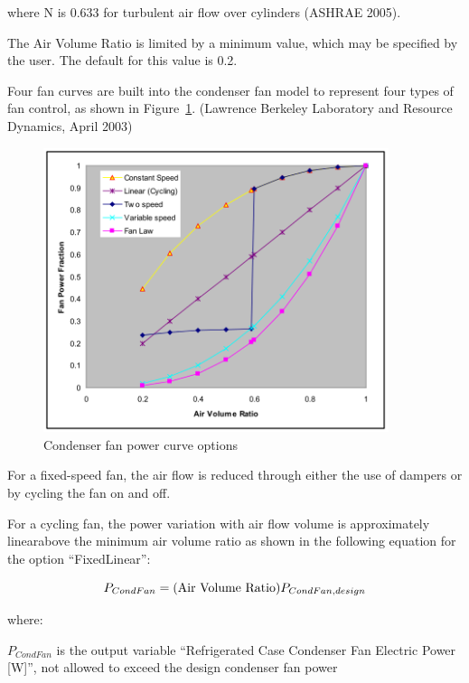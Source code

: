 where N is 0.633 for turbulent air flow over cylinders (ASHRAE 2005).

The Air Volume Ratio is limited by a minimum value, which may be specified by the user. The default for this value is 0.2.

Four fan curves are built into the condenser fan model to represent four types of fan control, as shown in Figure~\ref{fig:condenser-fan-power-curve-options}. (Lawrence Berkeley Laboratory and Resource Dynamics, April 2003)

\begin{figure}[hbtp] %
\centering
\includegraphics[width=0.9\textwidth, height=0.9\textheight, keepaspectratio=true]{media/image6291.svg.png}
\caption{Condenser fan power curve options \protect \label{fig:condenser-fan-power-curve-options}}
\end{figure}

For a fixed-speed fan, the air flow is reduced through either the use of dampers or by cycling the fan on and off.

For a cycling fan, the power variation with air flow volume is approximately linearabove the minimum air volume ratio as shown in the following equation for the option ``FixedLinear'':

\begin{equation}
{P_{CondFan}} = ({\rm{Air~Volume~Ratio}}){P_{CondFan,design}}
\end{equation}

where:

\({P_{CondFan}}\) is the output variable ``Refrigerated Case Condenser Fan Electric Power {[}W{]}'', not allowed to exceed the design condenser fan power

